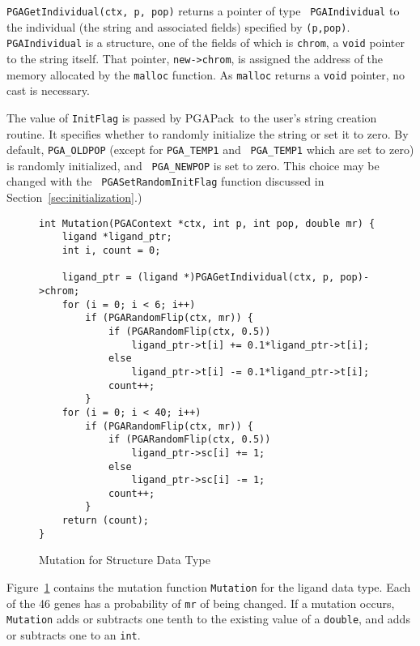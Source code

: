 \documentclass{report}
\newcommand{\pga}{PGAPack}
\begin{document}
{\tt PGAGetIndividual(ctx, p, pop)} returns a pointer of type {\tt
PGAIndividual} to the individual (the string and associated fields) specified
by {\tt (p,pop)}.  {\tt PGAIndividual} is a structure, one of the fields of
which is {\tt chrom}, a {\tt void} pointer to the string itself. That pointer,
{\tt new->chrom}, is assigned the address of the memory allocated by
the {\tt malloc} function.  As {\tt malloc} returns a {\tt void} pointer, no
cast is necessary.

The value of {\tt InitFlag} is passed by \pga\ to the user's string creation
routine. It specifies whether to randomly initialize the string or set it to
zero. By default, {\tt PGA\_OLDPOP} (except for {\tt PGA\_TEMP1} and {\tt
PGA\_TEMP1} which are set to zero) is randomly initialized, and {\tt
PGA\_NEWPOP} is set to zero.  This choice may be changed with the {\tt
PGASetRandomInitFlag} function discussed in Section~\ref{sec:initialization}.)


\begin{figure}
\begin{verbatim}
int Mutation(PGAContext *ctx, int p, int pop, double mr) {
    ligand *ligand_ptr;
    int i, count = 0;

    ligand_ptr = (ligand *)PGAGetIndividual(ctx, p, pop)->chrom;
    for (i = 0; i < 6; i++)
        if (PGARandomFlip(ctx, mr)) {
            if (PGARandomFlip(ctx, 0.5))
                ligand_ptr->t[i] += 0.1*ligand_ptr->t[i];
            else
                ligand_ptr->t[i] -= 0.1*ligand_ptr->t[i];
            count++;
        }
    for (i = 0; i < 40; i++)
        if (PGARandomFlip(ctx, mr)) {
            if (PGARandomFlip(ctx, 0.5))
                ligand_ptr->sc[i] += 1;
            else
                ligand_ptr->sc[i] -= 1;
            count++;
        }
    return (count);
}
\end{verbatim}
\caption{Mutation for Structure Data Type}
\label{example1:new-datatype-mutation}
\end{figure}

Figure~\ref{example1:new-datatype-mutation} contains the mutation function
{\tt Mutation} for the ligand data type.  Each of the 46 genes has a
probability of {\tt mr} of being changed.  If a mutation occurs, {\tt
Mutation} adds or subtracts one tenth to the existing value of a {\tt double},
and adds or subtracts one to an {\tt int}.
\end{document}
